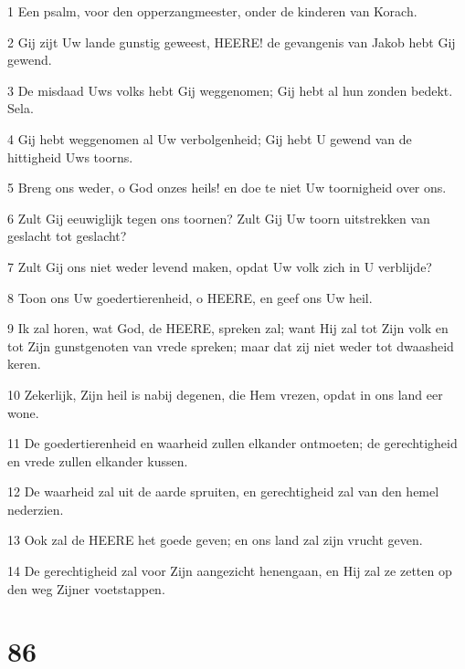\par 1 Een psalm, voor den opperzangmeester, onder de kinderen van Korach.
\par 2 Gij zijt Uw lande gunstig geweest, HEERE! de gevangenis van Jakob hebt Gij gewend.
\par 3 De misdaad Uws volks hebt Gij weggenomen; Gij hebt al hun zonden bedekt. Sela.
\par 4 Gij hebt weggenomen al Uw verbolgenheid; Gij hebt U gewend van de hittigheid Uws toorns.
\par 5 Breng ons weder, o God onzes heils! en doe te niet Uw toornigheid over ons.
\par 6 Zult Gij eeuwiglijk tegen ons toornen? Zult Gij Uw toorn uitstrekken van geslacht tot geslacht?
\par 7 Zult Gij ons niet weder levend maken, opdat Uw volk zich in U verblijde?
\par 8 Toon ons Uw goedertierenheid, o HEERE, en geef ons Uw heil.
\par 9 Ik zal horen, wat God, de HEERE, spreken zal; want Hij zal tot Zijn volk en tot Zijn gunstgenoten van vrede spreken; maar dat zij niet weder tot dwaasheid keren.
\par 10 Zekerlijk, Zijn heil is nabij degenen, die Hem vrezen, opdat in ons land eer wone.
\par 11 De goedertierenheid en waarheid zullen elkander ontmoeten; de gerechtigheid en vrede zullen elkander kussen.
\par 12 De waarheid zal uit de aarde spruiten, en gerechtigheid zal van den hemel nederzien.
\par 13 Ook zal de HEERE het goede geven; en ons land zal zijn vrucht geven.
\par 14 De gerechtigheid zal voor Zijn aangezicht henengaan, en Hij zal ze zetten op den weg Zijner voetstappen.

\chapter{86}

